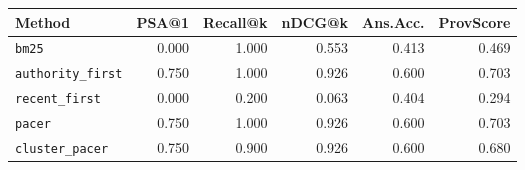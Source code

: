 \begin{tabular}{lrrrrr}
\hline
Method & PSA@1 & Recall@k & nDCG@k & Ans.Acc. & ProvScore \\
\hline
\texttt{bm25} & 0.000 & 1.000 & 0.553 & 0.413 & 0.469 \\
\texttt{authority\_first} & 0.750 & 1.000 & 0.926 & 0.600 & 0.703 \\
\texttt{recent\_first} & 0.000 & 0.200 & 0.063 & 0.404 & 0.294 \\
\texttt{pacer} & 0.750 & 1.000 & 0.926 & 0.600 & 0.703 \\
\texttt{cluster\_pacer} & 0.750 & 0.900 & 0.926 & 0.600 & 0.680 \\
\hline
\end{tabular}


